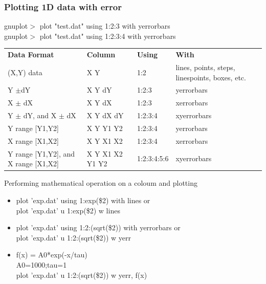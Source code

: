 \documentclass{beamer}
\begin{document}
		\begin{frame}
			\frametitle{Plotting 1D data with error}
			\footnotesize
			gnuplot$>$ plot "test.dat" using 1:2:3 with yerrorbars\\
			gnuplot$>$ plot "test.dat" using 1:2:3:4 with yerrorbars\\[1em]

			\scriptsize
			\begin{tabular}{p{3cm}p{2cm}p{1.1cm}p{3cm}}	
				\textbf{Data Format}	&\textbf{Column}	&\textbf{Using}		&\textbf{With}\\
				(X,Y) data				&X Y		&1:2		&lines, points, steps, linespoints, boxes, etc.\\
				Y $\pm$dY	&X Y dY		&1:2:3		&yerrorbars\\
				X $\pm$ dX	&X Y dX		&1:2:3		&xerrorbars\\
				Y $\pm$ dY, 
				and X $\pm$ dX	&X Y dX dY	&1:2:3:4	&xyerrorbars\\
				Y range [Y1,Y2]	&X Y Y1 Y2	&1:2:3:4	&yerrorbars\\
				X range [X1,X2]	&X Y X1 X2	&1:2:3:4	&xerrorbars\\
				Y range [Y1,Y2], 
				and X range [X1,X2]	&X Y X1 X2 Y1 Y2	& 1:2:3:4:5:6	& xyerrorbars		
			\end{tabular}
		\end{frame}
		\begin{frame}
			Performing mathematical operation on a coloum and plotting\\
			\begin{itemize}
			\item  plot 'exp.dat' using 1:exp(\$2) with lines \hspace{1cm} or \\
			plot 'exp.dat' u 1:exp(\$2) w lines
			
			\item plot 'exp.dat' using 1:2:(sqrt(\$2)) with yerrorbars \hspace{1cm} or \\
			plot 'exp.dat' u 1:2:(sqrt(\$2)) w yerr
			
			\item f(x) = A0*exp(-x/tau)\\
			A0=1000;tau=1\\
			plot 'exp.dat' u 1:2:(sqrt(\$2)) w yerr, f(x)
			\end{itemize}

			
			
		\end{frame}				
\end{document}
